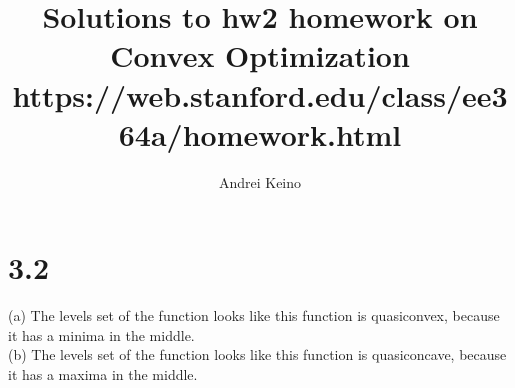 \documentclass{article}
\begin{document}
\title{Solutions to hw2 homework on Convex Optimization https://web.stanford.edu/class/ee364a/homework.html}
\author{Andrei Keino}
\maketitle
\section*{3.2}

(a)
The levels set of the function looks like this function is quasiconvex, because it has a minima in the middle.\\

(b)
The levels set of the function looks like this function is quasiconcave, because it has a maxima in the middle.\\
\end{document}
